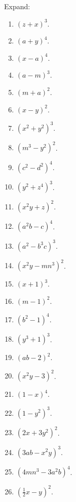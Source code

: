 \documentclass{book}
\begin{document}
Expand:
\begin{enumerate}
\item $(z+x)^3$.

\item $(a+y)^4$.

\item $(x-a)^4$.

\item $(a-m)^3$.

\item $(m+a)^2$.

\item $(x-y)^2$.

\item $(x^2+y^2)^3$.

\item $(m^3-y^2)^2$.

\item $(c^2-d^2)^4$.

\item $(y^2+z^4)^3$.

\item $(x^2y+z)^2$.

\item $(a^2b-c)^4$.

\item $(a^2-b^3c)^3$.

\item $(x^2y-mn^3)^2$.

\item $(x+1)^3$.

\item $(m-1)^2$.

\item $(b^2-1)^4$.

\item $(y^3+1)^3$.

\item $(ab-2)^2$.

\item $(x^2y-3)^2$.

\item $(1-x)^4$.

\item $(1-y^2)^3$.

\item $(2x+3y^2)^2$.

\item $(3ab-x^2y)^3$.

\item $(4mn^3-3a^2b)^4$.

\item $(\frac{1}{2}x-y)^2$.


\end{enumerate}
\end{document}
